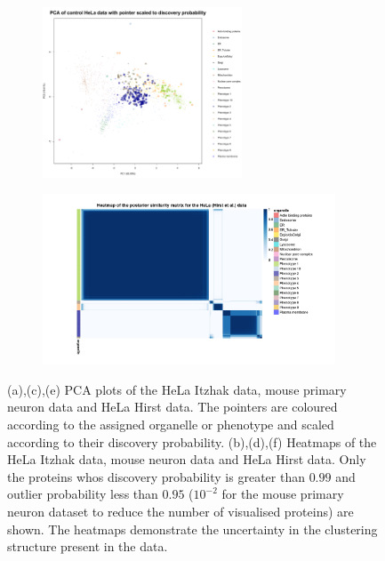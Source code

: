 \documentclass[12pt,english]{article}
\begin{document}
\begin{figure}
\begin{subfigure}[t]{0.5\textwidth}
		\caption{}
	\end{subfigure}
	~
	\begin{subfigure}[t]{0.5\textwidth}
		\centering
		\includegraphics[height=2in]{pcaHirst.pdf}
		\caption{}
	\end{subfigure}
	\begin{subfigure}[t]{0.5\textwidth}
		\centering
		\includegraphics[height=2in]{heatmapHirst.jpg}
		\caption{}
	\end{subfigure}
	\caption{(a),(c),(e) PCA plots of the HeLa Itzhak data, mouse primary neuron data and HeLa Hirst data. The pointers are coloured according to the assigned organelle or phenotype and scaled according to their discovery probability. (b),(d),(f) Heatmaps of the HeLa Itzhak data, mouse neuron data and HeLa Hirst data. Only the proteins whos discovery probability is greater than $0.99$ and outlier probability less than $0.95$ ($10^{-2}$ for the mouse primary neuron dataset to reduce the number of visualised proteins) are shown. The heatmaps demonstrate the uncertainty in the clustering structure present in the data.}
	\label{figure:DOM}
\end{figure}
\clearpage
\end{document}
